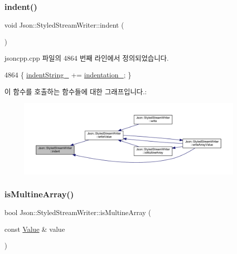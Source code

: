 \subsubsection{\texorpdfstring{indent()}{indent()}}
{\footnotesize\ttfamily void Json\+::\+Styled\+Stream\+Writer\+::indent (\begin{DoxyParamCaption}{ }\end{DoxyParamCaption})\hspace{0.3cm}{\ttfamily [private]}}



jsoncpp.\+cpp 파일의 4864 번째 라인에서 정의되었습니다.


\begin{DoxyCode}
4864 \{ \hyperlink{class_json_1_1_styled_stream_writer_a1481433ebe1491ea83b0beb92aed56c2}{indentString\_} += \hyperlink{class_json_1_1_styled_stream_writer_aa45d8fb4ca82d0550be9042012303713}{indentation\_}; \}
\end{DoxyCode}
이 함수를 호출하는 함수들에 대한 그래프입니다.\+:\nopagebreak
\begin{figure}[H]
\begin{center}
\leavevmode
\includegraphics[width=350pt]{class_json_1_1_styled_stream_writer_ab49409578422aa73b060e3492dd6c72a_icgraph}
\end{center}
\end{figure}
\mbox{\label{class_json_1_1_styled_stream_writer_a88f4d342cf25c73aabf77c1b8ba01e44}} 
\subsubsection{\texorpdfstring{is\+Multine\+Array()}{isMultineArray()}}
{\footnotesize\ttfamily bool Json\+::\+Styled\+Stream\+Writer\+::is\+Multine\+Array (\begin{DoxyParamCaption}\item[{const \hyperlink{class_json_1_1_value}{Value} \&}]{value }\end{DoxyParamCaption})\hspace{0.3cm}{\ttfamily [private]}}



